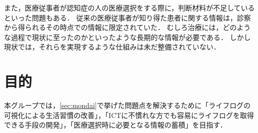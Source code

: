 \documentclass[../report]{subfiles}
\begin{document}
また，医療従事者が認知症の人の医療選択をする際に，判断材料が不足しているといった問題もある．
従来の医療従事者が知り得た患者に関する情報は，診察から得られるその時点での情報に限定されていた．
むしろ治療には，どのような過程で現状に至ったのかといったような長期的な情報が必要である．
しかし現状では，それらを実現するような仕組みは未だ整備されていない．

\section{目的}
本グループでは，\ref{sec:mondai}で挙げた問題点を解決するために「ライフログの可視化による生活習慣の改善」，「ICTに不慣れな方でも容易にライフログを取得できる手段の開発」，「医療選択時に必要となる情報の蓄積」を目指す．
\end{document}
